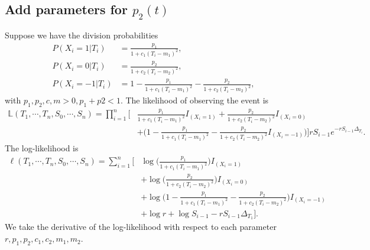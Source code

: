 \documentclass[11pt]{article}
\newcommand{\LL}{\mathbb{L}}
\begin{document}
\subsection*{Add parameters for $p_2(t)$}
Suppose we have the division probabilities
\begin{equation}
    \begin{split}
        P(X_i = 1 \vert T_i) & = \frac{p_1}{1+c_1(T_i-m_1)^2},\\
        P(X_i = 0 \vert T_i) & = \frac{p_2}{1+c_2(T_i-m_2)^2},\\
        P(X_i = -1 \vert T_i) & = 1-\frac{p_1}{1+c_1(T_i-m_1)^2} - \frac{p_2}{1+c_2(T_i-m_2)^2},
    \end{split}
\end{equation}
with $p_1, p_2, c, m > 0, p_1 + p2 < 1$. The likelihood of observing the event is 
\begin{equation}
    \begin{split}
        \LL (T_1, \cdots, T_n, S_0, \cdots, S_n) 
        = \prod_{i=1}^n \Big[& \frac{p_1}{1+c_1(T_i-m_1)^2} I_{(X_i = 1)} + \frac{p_2}{1+c_2(T_i-m_2)^2} I_{(X_i = 0)} \\
        &+ \Big( 1- \frac{p_1}{1+c_1(T_i-m_1)^2} - \frac{p_2}{1+c_2(T_i-m_2)^2} I_{(X_i = -1)} \Big) \Big] rS_{i-1} e^{-rS_{i-1} \Delta_{T_i}}.
    \end{split}
\end{equation}
The log-likelihood is
\begin{equation}
    \begin{split}
        \ell(T_1, \cdots, T_n, S_0, \cdots, S_n) = \sum_{i=1}^n \Big[ &\log \Big(\frac{p_1}{1+c_1(T_i-m_1)^2}\Big) I_{(X_i = 1)} \\
        & + \log \Big(\frac{p_2}{1+c_2(T_i-m_2)^2}\Big) I_{(X_i = 0)} \\
        & + \log \Big(1- \frac{p_1}{1+c_1(T_i-m_1)^2}- \frac{p_2}{1+c_2(T_i-m_2)^2} \Big) I_{(X_i = -1)} \\
        & + \log r + \log S_{i-1} - rS_{i-1}\Delta_{T_1} \Big].
    \end{split}
\end{equation}
We take the derivative of the log-likelihood with respect to each parameter $r, p_1, p_2, c_1, c_2, m_1, m_2$.
\end{document}
